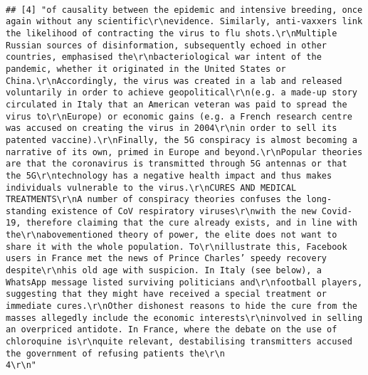 \documentclass[
]{book}
\begin{document}
\begin{verbatim}
                                                                                                                                                                                                                                                                                             
## [4] "of causality between the epidemic and intensive breeding, once again without any scientific\r\nevidence. Similarly, anti-vaxxers link the likelihood of contracting the virus to flu shots.\r\nMultiple Russian sources of disinformation, subsequently echoed in other countries, emphasised the\r\nbacteriological war intent of the pandemic, whether it originated in the United States or China.\r\nAccordingly, the virus was created in a lab and released voluntarily in order to achieve geopolitical\r\n(e.g. a made-up story circulated in Italy that an American veteran was paid to spread the virus to\r\nEurope) or economic gains (e.g. a French research centre was accused on creating the virus in 2004\r\nin order to sell its patented vaccine).\r\nFinally, the 5G conspiracy is almost becoming a narrative of its own, primed in Europe and beyond.\r\nPopular theories are that the coronavirus is transmitted through 5G antennas or that the 5G\r\ntechnology has a negative health impact and thus makes individuals vulnerable to the virus.\r\nCURES AND MEDICAL TREATMENTS\r\nA number of conspiracy theories confuses the long-standing existence of CoV respiratory viruses\r\nwith the new Covid-19, therefore claiming that the cure already exists, and in line with the\r\nabovementioned theory of power, the elite does not want to share it with the whole population. To\r\nillustrate this, Facebook users in France met the news of Prince Charles’ speedy recovery despite\r\nhis old age with suspicion. In Italy (see below), a WhatsApp message listed surviving politicians and\r\nfootball players, suggesting that they might have received a special treatment or immediate cures.\r\nOther dishonest reasons to hide the cure from the masses allegedly include the economic interests\r\ninvolved in selling an overpriced antidote. In France, where the debate on the use of chloroquine is\r\nquite relevant, destabilising transmitters accused the government of refusing patients the\r\n                                                                                                    4\r\n"                                                                                                                                                                                                                                                                                                                                                                                                                                                                                                                                                                                                                                                                                                                                                                                                                                                                                                                                                                                   
\end{verbatim}
\end{document}
